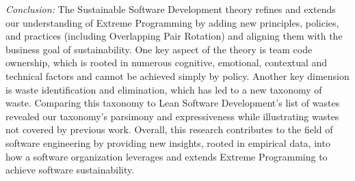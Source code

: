 \textit{Conclusion:} The Sustainable Software Development theory refines and extends our understanding of Extreme Programming by adding new principles, policies, and practices (including Overlapping Pair Rotation) and aligning them with the business goal of sustainability. One key aspect of the theory is team code ownership, which is rooted in numerous cognitive, emotional, contextual and technical factors and cannot be achieved simply by policy. Another key dimension is waste identification and elimination, which has led to a new taxonomy of waste. Comparing this taxonomy to Lean Software Development's list of wastes revealed our taxonomy's parsimony and expressiveness while illustrating wastes not covered by previous work. Overall, this research contributes to the field of software engineering by providing new insights, rooted in empirical data, into how a software organization leverages and extends Extreme Programming to achieve software sustainability.
